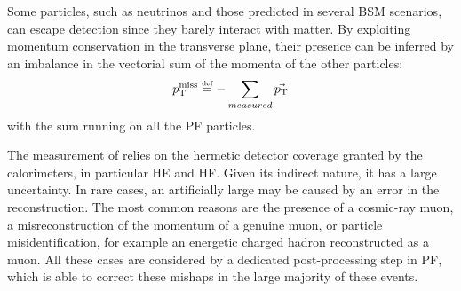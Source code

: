 \label{sec:MET}
Some particles, such as neutrinos and those predicted in several BSM scenarios, can escape detection since they barely interact with matter.
By exploiting momentum conservation in the transverse plane, their presence can be inferred by an imbalance in the vectorial sum of the momenta of the other particles:
\begin{equation}
  p_{\mathrm{T}}^\text{miss} \stackrel{\text{\tiny def}}{=} -\sum_{measured} \vec{p_{\mathrm{T}}}
\end{equation}
with the sum running on all the PF particles.

The measurement of \ptmiss relies on the hermetic detector coverage granted by the calorimeters, in particular HE and HF.
Given its indirect nature, it has a large uncertainty.
In rare cases, an artificially large \ptmiss may be caused by an error in the reconstruction. %
The most common reasons are the presence of a cosmic-ray muon,
a misreconstruction of the momentum of a genuine muon,
or particle misidentification, for example an energetic charged hadron reconstructed as a muon.
All these cases are considered by a dedicated post-processing step in PF,
which is able to correct these mishaps in the large majority of these events.
